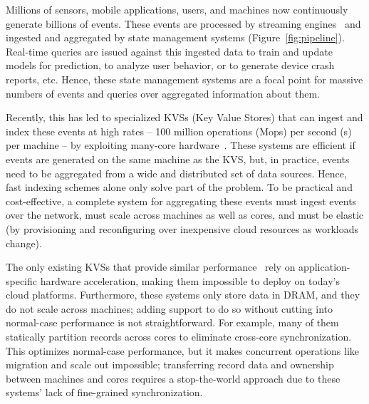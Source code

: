 

Millions of sensors, mobile applications, users, and machines now
continuously generate billions of events.
%
These events are processed by streaming
engines~\cite{spark-streaming,trill} and ingested and aggregated
by state management systems (Figure~\ref{fig:pipeline}).
%
Real-time queries are issued against this ingested data to train and
update models for prediction, to analyze user behavior, or to generate
device crash reports, etc.
%
Hence, these state management systems are a focal point for massive numbers of
events and queries over aggregated information about them.

Recently, this has led to specialized KVSs (Key Value Stores) that can
ingest and index these events at high rates -- 100 million operations (Mops) per second (s) per machine -- by
exploiting many-core hardware~\cite{faster,anna}.
%
These systems are efficient if events are generated on the same machine as
the KVS, but, in practice, events need to be aggregated from a wide
and distributed set of data sources.
%
Hence, fast indexing schemes alone only solve part of the problem.
%
To be practical and cost-effective, a complete system for aggregating these
events must ingest events over the network, must scale across machines as
well as cores, and must be elastic (by provisioning and reconfiguring over
inexpensive cloud resources as workloads change).

The only existing KVSs that provide similar
performance~\cite{mica,flexnic,floem,kvdirect} rely on application-specific
hardware acceleration, making them impossible to deploy on today's cloud
platforms.
%
Furthermore, these systems only store data in DRAM, and they do not scale across
machines; adding support to do so without cutting into normal-case performance
is not straightforward.
%
For example, many of them statically partition records across cores to
eliminate cross-core synchronization.
%
This optimizes normal-case performance, but it makes concurrent
operations like migration and scale out impossible; transferring record data
and ownership between machines and cores requires a stop-the-world approach
due to these systems' lack of fine-grained synchronization.

